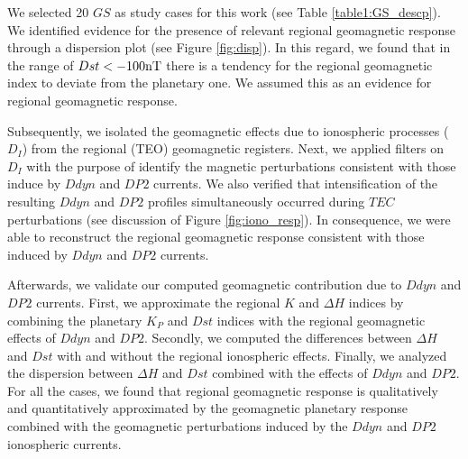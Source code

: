 \documentclass[a4paper,fleqn]{cas-dc}
\begin{document}
We selected 20 $GS$ as study cases for this work (see Table \ref{table1:GS_descp}). We identified evidence for the presence of relevant regional geomagnetic response through a dispersion plot (see Figure \ref{fig:disp}). In this regard, we found that in the range of $Dst < -100 {\rm nT}$ there is a tendency for the regional geomagnetic index to deviate from the planetary one. We assumed this as an evidence for regional geomagnetic response.

Subsequently, we isolated the geomagnetic effects due to ionospheric processes ($D_I$) from the regional (TEO) geomagnetic registers. Next, we applied filters on $D_I$ with the purpose of identify the magnetic perturbations consistent with those induce by $Ddyn$ and $DP2$ currents. We also verified that intensification of the resulting $Ddyn$ and $DP2$ profiles simultaneously occurred during $TEC$ perturbations (see discussion of Figure \ref{fig:iono_resp}). In consequence, we were able to reconstruct the regional geomagnetic response consistent with those induced by $Ddyn$ and $DP2$ currents.

Afterwards, we validate our computed geomagnetic contribution due to $Ddyn$ and $DP2$ currents. First, we approximate the regional $K$ and $\Delta H$ indices by combining the planetary $K_P$ and $Dst$ indices with the regional geomagnetic effects of $Ddyn$ and $DP2$. Secondly, we computed the differences between $\Delta H$ and $Dst$ with and without the regional ionospheric effects. Finally, we analyzed the dispersion between $\Delta H$ and $Dst$ combined with the effects of $Ddyn$ and $DP2$. For all the cases, we found that regional geomagnetic response is qualitatively and quantitatively approximated by the geomagnetic planetary response combined with the geomagnetic perturbations induced by the $Ddyn$ and $DP2$ ionospheric currents. 



\end{document}
